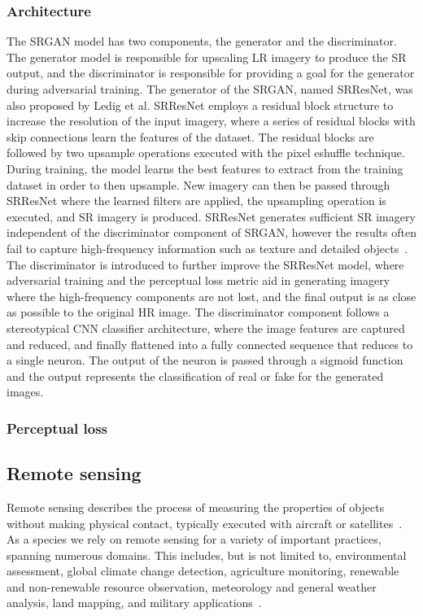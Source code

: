 \subsubsection{Architecture}
The SRGAN model has two components, the generator and the discriminator. The generator model is responsible for upscaling LR imagery to produce the SR output, and the discriminator is responsible for providing a goal for the generator during adversarial training. The generator of the SRGAN, named SRResNet, was also proposed by Ledig et al. SRResNet employs a residual block structure to increase the resolution of the input imagery, where a series of residual blocks with skip connections learn the features of the dataset. The residual blocks are followed by two upsample operations executed with the pixel eshuffle technique. During training, the model learns the best features to extract from the training dataset in order to then upsample. New imagery can then be passed through SRResNet where the learned filters are applied, the upsampling operation is executed, and SR imagery is produced. SRResNet generates sufficient SR imagery independent of the discriminator component of SRGAN, however the results often fail to capture high-frequency information such as texture and detailed objects~\cite{srgan}. The discriminator is introduced to further improve the SRResNet model, where adversarial training and the perceptual loss metric aid in generating imagery where the high-frequency components are not lost, and the final output is as close as possible to the original HR image. The discriminator component follows a stereotypical CNN classifier architecture, where the image features are captured and reduced, and finally flattened into a fully connected sequence that reduces to a single neuron. The output of the neuron is passed through a sigmoid function and the output represents the classification of real or fake for the generated images.

\subsubsection{Perceptual loss}

\subsection{Remote sensing}
Remote sensing describes the process of measuring the properties of objects without making physical contact, typically executed with aircraft or satellites~\cite{remoteSensing,remoteSensingImageProcessing}. As a species we rely on remote sensing for a variety of important practices, spanning numerous domains. This includes, but is not limited to, environmental assessment, global climate change detection, agriculture monitoring, renewable and non-renewable resource observation, meteorology and general weather analysis, land mapping, and military applications~\cite{remoteSensingImageProcessing, remoteSensingUses, remoteSensingGANsReview}.

